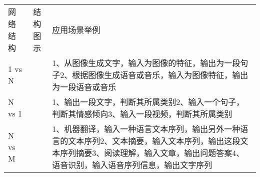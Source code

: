 \begin{longtable}[]{ lcl }
\begin{minipage}[b]{0.09\columnwidth}\raggedright\strut
网络结构\strut
\end{minipage} & \begin{minipage}[b]{0.23\columnwidth}%
结构图示\strut
\end{minipage} & \begin{minipage}[b]{0.59\columnwidth}\raggedright\strut
应用场景举例\strut
\end{minipage}\tabularnewline
\begin{minipage}[t]{0.09\columnwidth}\raggedright\strut
1 vs N\strut
\end{minipage} & \begin{minipage}[t]{0.23\columnwidth}%
\end{minipage} & \begin{minipage}[t]{0.59\columnwidth}\raggedright\strut
1、从图像生成文字，输入为图像的特征，输出为一段句子2、根据图像生成语音或音乐，输入为图像特征，输出为一段语音或音乐\strut
\end{minipage}\tabularnewline
\begin{minipage}[t]{0.09\columnwidth}\raggedright\strut
N vs 1\strut
\end{minipage} & \begin{minipage}[t]{0.23\columnwidth}%
\end{minipage} & \begin{minipage}[t]{0.59\columnwidth}\raggedright\strut
1、输出一段文字，判断其所属类别2、输入一个句子，判断其情感倾向3、输入一段视频，判断其所属类别\strut
\end{minipage}\tabularnewline
\begin{minipage}[t]{0.09\columnwidth}\raggedright\strut
N vs M\strut
\end{minipage} & \begin{minipage}[t]{0.23\columnwidth}%
\end{minipage} & \begin{minipage}[t]{0.59\columnwidth}\raggedright\strut
1、机器翻译，输入一种语言文本序列，输出另外一种语言的文本序列2、文本摘要，输入文本序列，输出这段文本序列摘要3、阅读理解，输入文章，输出问题答案4、语音识别，输入语音序列信息，输出文字序列\strut
\end{minipage}\tabularnewline
\end{longtable}

